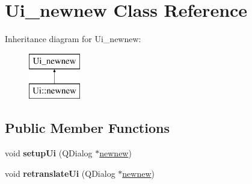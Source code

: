 \hypertarget{class_ui__newnew}{}\section{Ui\+\_\+newnew Class Reference}
\label{class_ui__newnew}
Inheritance diagram for Ui\+\_\+newnew\+:\begin{figure}[H]
\begin{center}
\leavevmode
\includegraphics[height=2.000000cm]{class_ui__newnew}
\end{center}
\end{figure}
\subsection*{Public Member Functions}
\begin{DoxyCompactItemize}
\item 
\mbox{\label{class_ui__newnew_ac0f6019b30691827488a3fd1cb21cd9b}} 
void {\bfseries setup\+Ui} (Q\+Dialog $\ast$\hyperlink{classnewnew}{newnew})
\item 
\mbox{\label{class_ui__newnew_a7200366219e1e80993c05065825cf5c2}} 
void {\bfseries retranslate\+Ui} (Q\+Dialog $\ast$\hyperlink{classnewnew}{newnew})
\end{DoxyCompactItemize}
